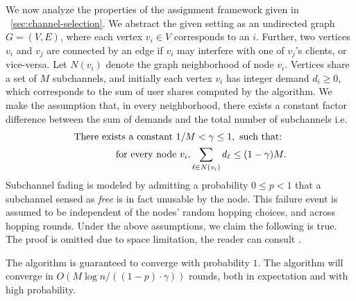 We now analyze the properties of the assignment framework given in ~\ref{sec:channel-selection}. 
We abstract the given setting as an undirected graph $G = (V, E)$, where each vertex $v_i \in V$ corresponds to an \eNB $i$. 
Further, two vertices $v_i$ and $v_j$ are connected by an edge if $v_i$ may interfere with one of $v_j$'s clients, or vice-versa. 
Let $N(v_i)$ denote the graph neighborhood of node $v_i$. 
Vertices share a set of $M$ subchannels, and initially each vertex $v_i$ has integer demand $d_i \geq 0$, which corresponds to the sum of user shares computed by the algorithm. 
We make the assumption that, in every neighborhood, there exists a constant factor difference between the sum of demands and the total number of subchannels i.e.
\begin{eqnarray*}
  \textnormal{There exists a constant } 1 / M < \gamma \leq 1, \textnormal{ such that: } \\ \textnormal{ for every node }  v_i, \sum_{\ell \in N(v_i)} d_\ell \leq (1 - \gamma) M.
\end{eqnarray*}
Subchannel fading is modeled by admitting a probability $0 \leq p < 1$ that a subchannel sensed as \emph{free} 
is in fact unusable by the node. 
This failure event is assumed to be independent of the nodes' random hopping choices, and across hopping rounds. 
Under the above assumptions, we claim the following is true. The proof is omitted due to space limitation, the reader can consult \cite{}.
\begin{thm}
\label{thm:convergence}
	 The algorithm is guaranteed to converge with probability $1$. The algorithm will converge in $O( M \log n / ((1 - p) \cdot \gamma) )$ rounds, both in expectation and with high probability.   
\end{thm}
 
	
